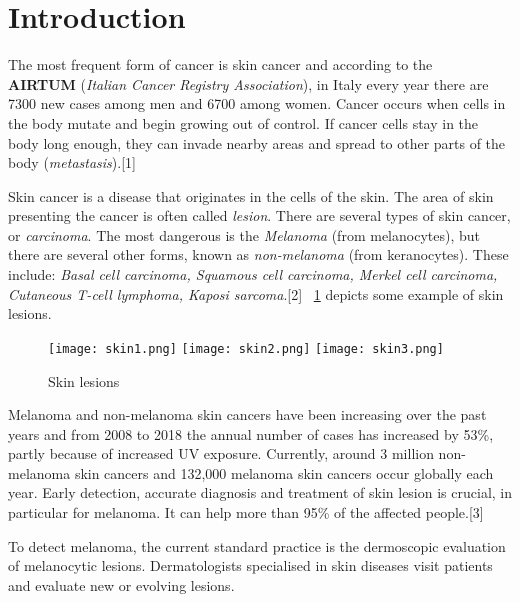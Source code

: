 \documentclass[12pt,a4paper,oneside]{report} %
\begin{document}
\chapter*{Introduction}
\setcounter{secnumdepth}{0
}
The most frequent form of cancer is skin cancer and according to the \\ \textbf{AIRTUM} (\textit {Italian Cancer Registry Association}), in Italy every year there are 7300 new cases 
among men and 6700 among women. Cancer occurs when cells in the body mutate and begin growing out of control. If cancer cells stay in the body long enough, they can invade nearby 
areas and spread to other parts of the body (\textit {metastasis}).[1]
\newline

Skin cancer is a disease that originates in the cells of the skin. The area of skin presenting the cancer is often called \textit {lesion}. There are several types of skin cancer, or \textit {carcinoma}. 
The most dangerous is the \textit {Melanoma} (from melanocytes), but there are several other forms, known as \textit {non-melanoma} (from keranocytes). These include:
\textit {Basal cell carcinoma, Squamous cell carcinoma, Merkel cell carcinoma, Cutaneous T-cell lymphoma, Kaposi sarcoma}.[2] \figurename~\ref{fig:skinlesion} depicts some 
example of skin lesions.
\vspace{15mm}
\begin{figure}[h!]
\begin{center}
  \texttt{[image: skin1.png]}
  \texttt{[image: skin2.png]}
  \texttt{[image: skin3.png]}
 \caption{Skin lesions}
\label{fig:skinlesion}
\end{center}
\end{figure}

Melanoma and non-melanoma skin cancers have been increasing over the past years and from 2008 to 2018 the annual number of cases has increased by 53\%, partly because of 
increased UV exposure. Currently, around 3 million non-melanoma skin cancers and 132,000 melanoma skin cancers occur globally each year. 
Early detection, accurate diagnosis and treatment of skin lesion is crucial, in particular for melanoma. It can help more than 95\% of the affected people.[3] 
\newline

To detect melanoma, the current standard practice is the dermoscopic evaluation of melanocytic lesions. Dermatologists specialised in skin diseases visit patients and evaluate new or evolving lesions. 
\newline
\end{document}
